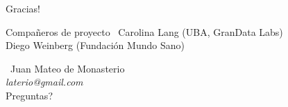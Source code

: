 \documentclass[xcolor=x11names]{beamer}
\begin{document}
\begin{frame}{Gracias! }

	\begin{block}{Compañeros de proyecto}
					\center\
					Carolina Lang (UBA, GranData Labs) \\
					 Diego Weinberg (Fundación Mundo Sano) \\
	\end{block}

				\center\
				Juan Mateo de Monasterio \\
				\textit{laterio@gmail.com} \\
				Preguntas? \\

\end{frame}




\justifying%
% 
% 


\vfill
\end{document}
